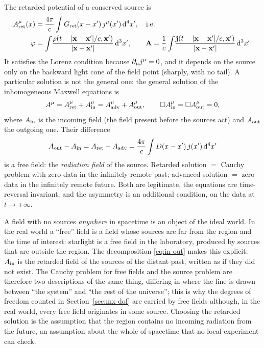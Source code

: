 The retarded potential of a conserved source is
\begin{equation}\label{eq:retarded}
\begin{aligned}
A^\mu_{\rm ret}(x)&=\frac{4\pi}{c}\int G_{\rm ret}(x-x')\,j^\mu(x')\,\mathrm{d}^4x',\quad\text{i.e.}\\
\varphi&=\int\!\frac{\rho(t-|\mathbf{x}-\mathbf{x}'|/c,\mathbf{x}')}{|\mathbf{x}-\mathbf{x}'|}\,\mathrm{d}^3x',\qquad
\mathbf{A}=\frac1c\int\!\frac{\mathbf{j}(t-|\mathbf{x}-\mathbf{x}'|/c,\mathbf{x}')}{|\mathbf{x}-\mathbf{x}'|}\,\mathrm{d}^3x' .
\end{aligned}
\end{equation}
It satisfies the Lorenz condition because $\partial_\mu j^\mu=0$, and it depends
on the source only on the backward light cone of the field point
(sharply, with no tail).  A particular solution is not the general one:
the general solution of the inhomogeneous Maxwell equations is
\begin{equation}\label{eq:in-out}
A^\mu=A^\mu_{\rm ret}+A^\mu_{\rm in}=A^\mu_{\rm adv}+A^\mu_{\rm out},\qquad
\Box A^\mu_{\rm in}=\Box A^\mu_{\rm out}=0,
\end{equation}
where $A_{\rm in}$ is the incoming field (the field present before the sources
act) and $A_{\rm out}$ the outgoing one.  Their difference
\begin{equation}
A_{\rm out}-A_{\rm in}=A_{\rm ret}-A_{\rm adv}=\frac{4\pi}{c}\int D(x-x')\,j(x')\,\mathrm{d}^4x'
\end{equation}
is a free field: the \emph{radiation field} of the source.  Retarded solution
$=$ Cauchy problem with zero data in the infinitely remote past;
advanced solution $=$ zero data in the infinitely remote future.  Both
are legitimate, the equations are time-reversal invariant, and the
asymmetry is an additional condition, on the data at $t\to\mp\infty$.

\begin{remark}
A field with no sources \emph{anywhere} in spacetime is an object of the
ideal world.  In the real world a ``free'' field is a field whose sources
are far from the region and the time of interest: starlight is a free
field in the laboratory, produced by sources that are outside the
region.  The decomposition \eqref{eq:in-out} makes this explicit:
$A_{\rm in}$ is the retarded field of the sources of the
distant past, written as if they did not exist.  The Cauchy problem for
free fields and the source problem are therefore two descriptions of
the same thing, differing in where the line is drawn between ``the
system'' and ``the rest of the universe''; this is why the degrees of
freedom counted in Section~\ref{sec:mx-dof} are carried by free fields
although, in the real world, every free field originates in some
source.  Choosing the retarded solution is the assumption that the
region contains no incoming radiation from the future, an assumption
about the whole of spacetime that no local experiment can check.
\end{remark}

